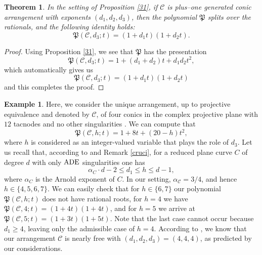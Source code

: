\documentclass[11pt]{article}
\theoremstyle{plain}
\newtheorem{theorem}[thm]{Theorem}
\theoremstyle{definition}
\newtheorem{example}[thm]{Example}
\begin{document}
\begin{theorem}
\label{mmm}
In the setting of Proposition \ref{31}, if $\mathcal{C}$ is plus--one generated conic arrangement with exponents $(d_1, d_2, d_3)$, then the polynomial $\mathfrak{P}$ splits over the rationals, and the following identity holds:
    $$\mathfrak{P}(\mathcal{C}, d_3;t)=(1+d_1t)(1+d_2t).$$
\end{theorem}

\begin{proof}
    Using Proposition \ref{31}, we see that $\mathfrak{P}$ has the presentation
    $$\mathfrak{P}(\mathcal{C}, d_3;t)=1+(d_1+d_2)t+d_1d_2t^2 ,$$
    which automatically gives us
    $$\mathfrak{P}(\mathcal{C}, d_3;t)=(1+d_1t)(1+d_2t)$$
    and this completes the proof.
\end{proof}

\begin{example}
\label{ex33}
Here, we consider the unique arrangement, up to projective equivalence and denoted by $\mathcal{C}$, of four conics in the complex projective plane with $12$ tacnodes and no other singularities  \cite[Proposition 7]{GM}. We can compute that
$$\mathfrak{P}(\mathcal{C},h;t) = 1 + 8t + (20-h)t^2,$$
where $h$ is considered as an integer-valued variable that plays the role of $d_3$. Let us recall that, according to \cite[Theorem 2.1]{DimSer} and Remark \ref{cruci}, for a reduced plane curve $C$ of degree $d$ with only ${\rm ADE}$ singularities one has
$$ \alpha_C \cdot d - 2 \leq d_{1} \leq h \leq d-1,$$
where $\alpha_C$ is the Arnold exponent of $C$. In our setting, $\alpha_{\mathcal{C}} = 3/4$, and hence $h \in \{4,5,6,7\}$.
We can easily check that for $h \in \{6,7\}$ our polynomial $\mathfrak{P}(\mathcal{C},h;t)$ does not have rational roots, for $h=4$ we have $\mathfrak{P}(\mathcal{C},4;t) = (1+4t)(1+4t)$, and for $h=5$ we arrive at $\mathfrak{P}(\mathcal{C},5;t) = (1+3t)(1+5t)$. Note that the last case cannot occur because $d_{1} \geq  4$, leaving only the admissible case of $h = 4$. According to \cite{DJP}, we know that our arrangement $\mathcal{C}$ is nearly free with $(d_{1},d_{2},d_{3})=(4,4,4)$, as predicted by our considerations.
\end{example}
\end{document}
